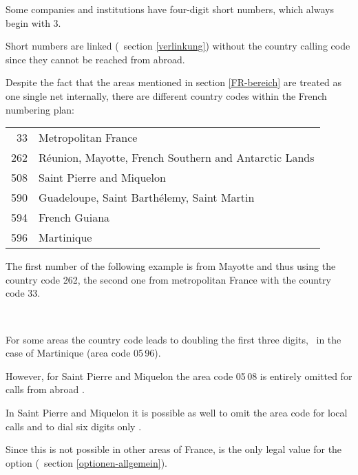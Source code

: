 \documentclass[numbers=noenddot]{scrreprt}
\newcommand*{\vglAbschnitt}[1]{(\cf\ section \ref{#1})}
\begin{document}
Some companies and institutions have four-digit short numbers, which always begin with 3.
\begin{sidebyside}
\end{sidebyside}
Short numbers are linked
\vglAbschnitt{verlinkung} without the country calling code since they cannot be reached from abroad.

Despite the fact that the areas mentioned in section \ref{FR-bereich} are treated as one single net internally, there are different country codes within the French numbering plan:
\begin{center}
\begin{tabular}{rl}
33 & Metropolitan France \\
262 & R\'eunion, Mayotte, French Southern and Antarctic Lands \\
508 & Saint Pierre and Miquelon \\
590 & Guadeloupe, Saint Barth\'elemy, Saint Martin \\
594 & French Guiana \\
596 & Martinique \\
\end{tabular}
\end{center}
The first number of the following example is from Mayotte and thus using the country code 262, the second one from metropolitan France with the country code 33.
\begin{sidebyside}
   \\
\end{sidebyside}

For some areas the country code leads to doubling the first three digits, \eg\ in the case of Martinique (area code 05\,96).
\begin{sidebyside}
\end{sidebyside}
However, for Saint Pierre and Miquelon the area code 05\,08 is entirely omitted for calls from abroad \cite[4]{ARCEP}.
\begin{sidebyside}
\end{sidebyside}

In Saint Pierre and Miquelon it is possible as well to omit the area code for local calls and to dial six digits only \cite[4]{ARCEP}.
\begin{sidebyside}
\end{sidebyside}
Since this is not possible in other areas of France,  is the only legal value for the  option \vglAbschnitt{optionen-allgemein}.
\end{document}
